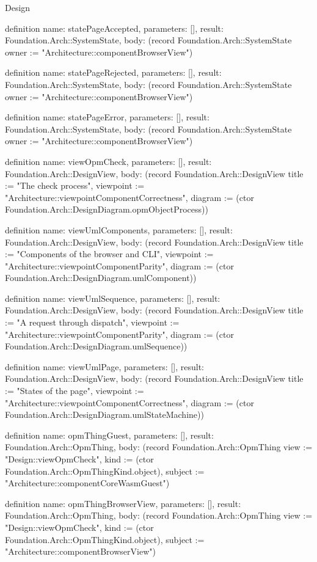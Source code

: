 \begin{lexlean}{Design}
\begin{semanticmodule}
definition{
  name: statePageAccepted,
  parameters: [],
  result: Foundation.Arch::SystemState,
  body: (record Foundation.Arch::SystemState {owner := "Architecture::componentBrowserView"})
}

definition{
  name: statePageRejected,
  parameters: [],
  result: Foundation.Arch::SystemState,
  body: (record Foundation.Arch::SystemState {owner := "Architecture::componentBrowserView"})
}

definition{
  name: statePageError,
  parameters: [],
  result: Foundation.Arch::SystemState,
  body: (record Foundation.Arch::SystemState {owner := "Architecture::componentBrowserView"})
}

definition{
  name: viewOpmCheck,
  parameters: [],
  result: Foundation.Arch::DesignView,
  body: (record Foundation.Arch::DesignView {title := "The check process", viewpoint := "Architecture::viewpointComponentCorrectness", diagram := (ctor Foundation.Arch::DesignDiagram.opmObjectProcess)})
}

definition{
  name: viewUmlComponents,
  parameters: [],
  result: Foundation.Arch::DesignView,
  body: (record Foundation.Arch::DesignView {title := "Components of the browser and CLI", viewpoint := "Architecture::viewpointComponentParity", diagram := (ctor Foundation.Arch::DesignDiagram.umlComponent)})
}

definition{
  name: viewUmlSequence,
  parameters: [],
  result: Foundation.Arch::DesignView,
  body: (record Foundation.Arch::DesignView {title := "A request through dispatch", viewpoint := "Architecture::viewpointComponentParity", diagram := (ctor Foundation.Arch::DesignDiagram.umlSequence)})
}

definition{
  name: viewUmlPage,
  parameters: [],
  result: Foundation.Arch::DesignView,
  body: (record Foundation.Arch::DesignView {title := "States of the page", viewpoint := "Architecture::viewpointComponentCorrectness", diagram := (ctor Foundation.Arch::DesignDiagram.umlStateMachine)})
}

definition{
  name: opmThingGuest,
  parameters: [],
  result: Foundation.Arch::OpmThing,
  body: (record Foundation.Arch::OpmThing {view := "Design::viewOpmCheck", kind := (ctor Foundation.Arch::OpmThingKind.object), subject := "Architecture::componentCoreWasmGuest"})
}

definition{
  name: opmThingBrowserView,
  parameters: [],
  result: Foundation.Arch::OpmThing,
  body: (record Foundation.Arch::OpmThing {view := "Design::viewOpmCheck", kind := (ctor Foundation.Arch::OpmThingKind.object), subject := "Architecture::componentBrowserView"})
}


\end{semanticmodule}
\end{lexlean}
